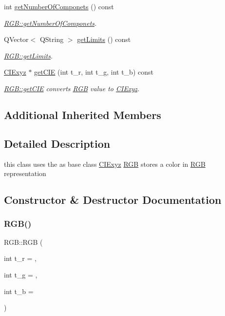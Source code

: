 \begin{DoxyCompactItemize}
int \hyperlink{class_r_g_b_a7561d57d6706bc25ea10762d906b2345}{get\+Number\+Of\+Componets} () const
\begin{DoxyCompactList}\small\item\em \hyperlink{class_r_g_b_a7561d57d6706bc25ea10762d906b2345}{R\+G\+B\+::get\+Number\+Of\+Componets}. \end{DoxyCompactList}\item 
Q\+Vector$<$ Q\+String $>$ \hyperlink{class_r_g_b_a4ae8d5c061e45f557a5924f2237c1d0e}{get\+Limits} () const
\begin{DoxyCompactList}\small\item\em \hyperlink{class_r_g_b_a4ae8d5c061e45f557a5924f2237c1d0e}{R\+G\+B\+::get\+Limits}. \end{DoxyCompactList}\item 
\hyperlink{class_c_i_exyz}{C\+I\+Exyz} $\ast$ \hyperlink{class_r_g_b_a153f315167dfd89944c625d43b307b43}{get\+C\+IE} (int t\+\_\+r, int t\+\_\+g, int t\+\_\+b) const
\begin{DoxyCompactList}\small\item\em \hyperlink{class_r_g_b_ac4b085d5587c664f7f9ceae1eb857d24}{R\+G\+B\+::get\+C\+IE} converts \hyperlink{class_r_g_b}{R\+GB} value to \hyperlink{class_c_i_exyz}{C\+I\+Exyz}. \end{DoxyCompactList}\end{DoxyCompactItemize}
\subsection*{Additional Inherited Members}


\subsection{Detailed Description}
this class uses the as base class \hyperlink{class_c_i_exyz}{C\+I\+Exyz} \hyperlink{class_r_g_b}{R\+GB} stores a color in \hyperlink{class_r_g_b}{R\+GB} representation 

\subsection{Constructor \& Destructor Documentation}
\mbox{\label{class_r_g_b_ab48fc0751f6432ff993b31119f289001}} 
\subsubsection{\texorpdfstring{R\+G\+B()}{RGB()}\hspace{0.1cm}{\footnotesize\ttfamily [1/4]}}
{\footnotesize\ttfamily R\+G\+B\+::\+R\+GB (\begin{DoxyParamCaption}\item[{int}]{t\+\_\+r = {},  }\item[{int}]{t\+\_\+g = {},  }\item[{int}]{t\+\_\+b = {} }\end{DoxyParamCaption})}



